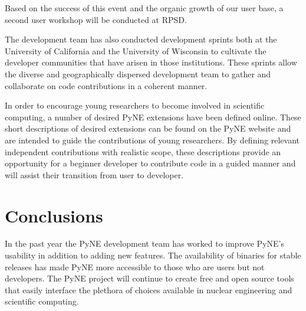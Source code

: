 \documentclass{anstrans}
\begin{document}
Based on the success of this event and the organic growth of our user base, a 
second user workshop will be conducted at RPSD.

The development team has also conducted development sprints both at the 
University of California and the University of Wisconsin to cultivate the 
developer communities that have arisen in those institutions. These sprints 
allow the diverse and geographically dispersed development team to gather and 
collaborate on code contributions in a coherent manner.

In order to encourage young researchers to become involved in scientific 
computing, a number of desired PyNE extensions have been defined online. These 
short descriptions of desired extensions can be found on the PyNE website and 
are intended to guide the contributions of young researchers. By defining 
relevant independent contributions with realistic scope, these descriptions 
provide an opportunity for a beginner developer to contribute code in a guided 
manner and will assist their transition from user to developer.

\section{Conclusions}

In the past year the PyNE development team has worked to improve PyNE's 
usability in addition to adding new features. The availability of binaries 
for stable releases has made PyNE more accessible to those who are users 
but not developers. The PyNE project will continue to create free and open 
source tools that easily interface the plethora of choices available in 
nuclear engineering and scientific computing. 

 
 
\end{document}
